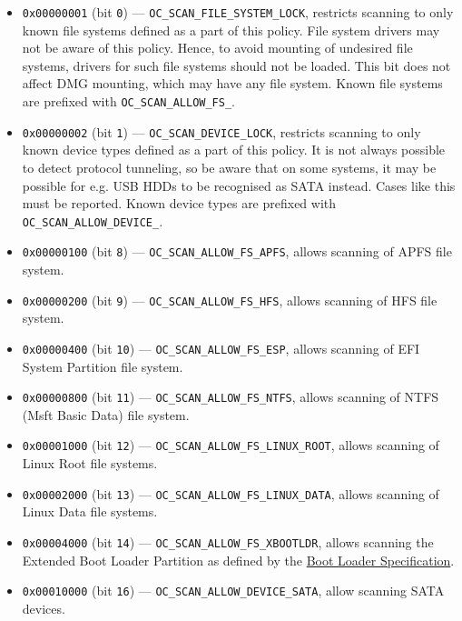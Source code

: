 \documentclass[]{article}
\providecommand{\tightlist}{%
  \setlength{\itemsep}{0pt}\setlength{\parskip}{0pt}}
\begin{document}
\begin{enumerate}
  \begin{itemize}
  \tightlist
    \item \texttt{0x00000001} (bit \texttt{0}) --- \texttt{OC\_SCAN\_FILE\_SYSTEM\_LOCK}, restricts
    scanning to only known file systems defined as a part of this policy. File system
    drivers may not be aware of this policy. Hence, to avoid mounting of undesired file
    systems, drivers for such file systems should not be loaded. This bit does not affect DMG mounting,
    which may have any file system. Known file systems are prefixed with
    \texttt{OC\_SCAN\_ALLOW\_FS\_}.
    \item \texttt{0x00000002} (bit \texttt{1}) --- \texttt{OC\_SCAN\_DEVICE\_LOCK}, restricts scanning
    to only known device types defined as a part of this policy. It is not always possible
    to detect protocol tunneling, so be aware that on some systems, it may be possible for
    e.g. USB HDDs to be recognised as SATA instead. Cases like this must be reported. Known device
    types are prefixed with \texttt{OC\_SCAN\_ALLOW\_DEVICE\_}.
    \item \texttt{0x00000100} (bit \texttt{8}) --- \texttt{OC\_SCAN\_ALLOW\_FS\_APFS}, allows scanning
    of APFS file system.
    \item \texttt{0x00000200} (bit \texttt{9}) --- \texttt{OC\_SCAN\_ALLOW\_FS\_HFS}, allows scanning
    of HFS file system.
    \item \texttt{0x00000400} (bit \texttt{10}) --- \texttt{OC\_SCAN\_ALLOW\_FS\_ESP}, allows scanning
    of EFI System Partition file system.
    \item \texttt{0x00000800} (bit \texttt{11}) --- \texttt{OC\_SCAN\_ALLOW\_FS\_NTFS}, allows scanning
    of NTFS (Msft Basic Data) file system.
    \item \texttt{0x00001000} (bit \texttt{12}) --- \texttt{OC\_SCAN\_ALLOW\_FS\_LINUX\_ROOT}, allows
    scanning of Linux Root file systems.
    \item \texttt{0x00002000} (bit \texttt{13}) --- \texttt{OC\_SCAN\_ALLOW\_FS\_LINUX\_DATA}, allows
    scanning of Linux Data file systems.
    \item \texttt{0x00004000} (bit \texttt{14}) --- \texttt{OC\_SCAN\_ALLOW\_FS\_XBOOTLDR}, allows
    scanning the Extended Boot Loader Partition as defined by the
    \href{https://systemd.io/BOOT\_LOADER\_SPECIFICATION/}{Boot Loader Specification}.
    \item \texttt{0x00010000} (bit \texttt{16}) --- \texttt{OC\_SCAN\_ALLOW\_DEVICE\_SATA}, allow
    scanning SATA devices.

\end{itemize}
\end{enumerate}
\end{document}
